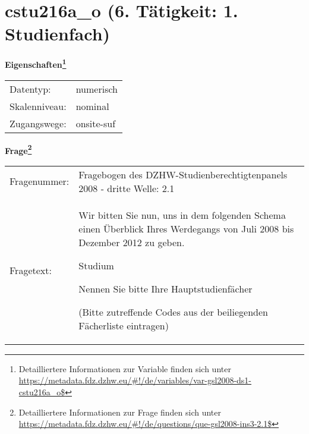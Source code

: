 
    \setcounter{footnote}{0}

    \vspace*{-1.8cm}
	\section{cstu216a\_o (6. Tätigkeit: 1. Studienfach)}
	\label{section:cstu216a_o}



    \vspace*{0.5cm}
    \noindent\textbf{Eigenschaften\footnote{Detailliertere Informationen zur Variable finden sich unter
		\url{https://metadata.fdz.dzhw.eu/\#!/de/variables/var-gsl2008-ds1-cstu216a_o$}}}\\
	\begin{tabularx}{\hsize}{@{}lX}
	Datentyp: & numerisch \\
	Skalenniveau: & nominal \\
	Zugangswege: &
	  onsite-suf
 \\
    \end{tabularx}



				\vspace*{0.5cm}
                \noindent\textbf{Frage\footnote{Detailliertere Informationen zur Frage finden sich unter
		              \url{https://metadata.fdz.dzhw.eu/\#!/de/questions/que-gsl2008-ins3-2.1$}}}\\
				\begin{tabularx}{\hsize}{@{}lX}
					Fragenummer: &
					  Fragebogen des DZHW-Studienberechtigtenpanels 2008 - dritte Welle:
					  2.1
 \\
					Fragetext: & Wir bitten Sie nun, uns in dem folgenden Schema einen Überblick Ihres Werdegangs von Juli 2008 bis Dezember 2012 zu geben.\par  Studium\par  Nennen Sie bitte Ihre Hauptstudienfächer\par  (Bitte zutreffende Codes aus der beiliegenden Fächerliste eintragen) \\
				\end{tabularx}





